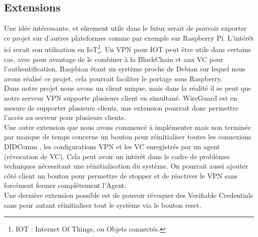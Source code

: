 \documentclass[12pt, openany]{report}
\begin{document}
\subsection{Extensions}
\noindent 
\begin{flushleft}
Une idée intéressante, et sûrement utile dans le futur serait de pouvoir exporter ce projet sur d'autres plateformes comme par exemple sur Raspberry Pi. L'intérêt ici serait son utilisation en IoT\footnote{IOT : Internet Of Things, ou Objets connectés.}. Un VPN pour IOT peut être utile dans certains cas, avec pour avantage de le combiner à la BlockChain et aux VC pour l'authentification. Raspbian étant un système proche de Debian sur lequel nous avons réalisé ce projet, cela pourrait faciliter le portage sous Raspberry.\\
Dans notre projet nous avons un client unique, mais dans la réalité il se peut que notre serveur VPN supporte plusieurs client en simultané. WireGuard est en mesure de supporter plusieurs clients, une extension pourrait donc permettre l'accès au serveur pour plusieurs clients.\\
Une autre extension que nous avons commencé à implémenter mais non terminée par manque de temps concerne un bouton pour réinitialiser toutes les connexions DIDComm , les configurations VPN et les VC enregistrés par un agent (révocation de VC). Cela peut avoir un intérêt dans le cadre de problèmes techniques nécessitant une réinitialisation du système. On pourrait aussi ajouter côté client un bouton pour permettre de stopper et de réactiver le VPN sans forcément fermer complètement l'Agent.\\
Une dernière extension possible est de pouvoir révoquer des Verifiable Credentials sans pour autant réinitialiser tout le système via le bouton reset.\\
\end{flushleft}

\newpage
\end{document}
